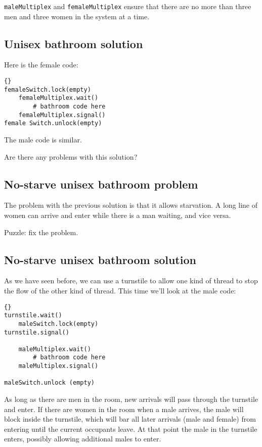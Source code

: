 \documentclass{book}
\newcommand{\clearemptydoublepage}{\newpage\cleardoublepage}
\begin{document}
{\tt maleMultiplex} and {\tt femaleMultiplex} ensure that there are no
more than three men and three women in the system at a time.


\clearemptydoublepage
\subsection {Unisex bathroom solution}

Here is the female code:

\begin{lstlisting}[title={Unisex bathroom solution (female)}]{}
femaleSwitch.lock(empty)
    femaleMultiplex.wait()
        # bathroom code here
    femaleMultiplex.signal()
female Switch.unlock(empty)
\end{lstlisting}

The male code is similar.

Are there any problems with this solution?

\clearemptydoublepage
\subsection {No-starve unisex bathroom problem}

The problem with the previous solution is that it allows starvation.
A long line of women can arrive and enter while there is a man
waiting, and vice versa.

Puzzle: fix the problem.


\clearemptydoublepage
\subsection {No-starve unisex bathroom solution}

As we have seen before, we can use a turnstile to allow one
kind of thread to stop the flow of the other kind of thread.
This time we'll look at the male code:

\begin{lstlisting}[title={No-starve unisex bathroom solution (male)}]{}
turnstile.wait()
    maleSwitch.lock(empty)
turnstile.signal()

    maleMultiplex.wait()
        # bathroom code here
    maleMultiplex.signal()

maleSwitch.unlock (empty)
\end{lstlisting}

As long as there are men in the room, new arrivals will pass
through the turnstile and enter.  If there are women in the room
when a male arrives, the male will block inside the turnstile,
which will bar all later arrivals (male and female) from entering
until the current occupants leave.  At that point the male in
the turnstile enters, possibly allowing additional males to enter.
\end{document}

